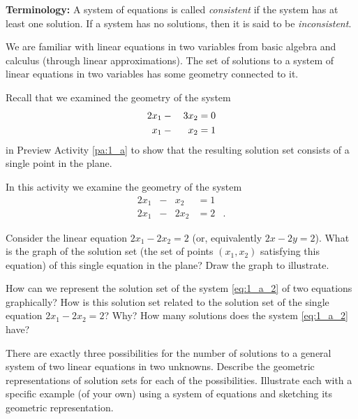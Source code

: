 \noindent \textbf{Terminology:} A system of equations is called \emph{consistent} if the system has at least one solution. If a system has no solutions, then it is said to be \emph{inconsistent}.


We are familiar with linear equations in two variables from basic algebra and calculus (through linear approximations). The set of solutions to a system of linear equations in two variables has some geometry connected to it.


\begin{activity} \label{act:1_a_2} Recall that we examined the geometry of the system 
\begin{alignat}{4}
2x_1 	&{}-{}	&3x_2 	&= 0  \notag \\%
x_1 	&{}-{} 	&x_2		&= 1 \notag %
\end{alignat}
in Preview Activity \ref{pa:1_a} to show that the resulting solution set consists of a single point in the plane.

In this activity we examine the geometry of the system 
\begin{equation}\label{eq:1_a_2}
\begin{alignedat}{4}
{2}x_1 	&{}-{}	&{}x_2 	&= 1&{}  \\ %
{2}x_1 	&{}-{} 	&{2}x_2		&= 2&{.} %
\end{alignedat}
\end{equation}
\ba
\item Consider the linear equation $2x_1-2x_2=2$ (or, equivalently $2x-2y=2$). What is the graph of the solution set (the set of points $(x_1, x_2)$ satisfying this equation) of this single equation in the plane? Draw the graph to illustrate. 


\item How can we represent the solution set of the system \eqref{eq:1_a_2} of two equations graphically? How is this solution set related to the solution set of the single equation $2x_1-2x_2=2$? Why? How many solutions does the system \eqref{eq:1_a_2} have? 


\item There are exactly three possibilities for the number of solutions to a general system of two linear equations in two unknowns. Describe the geometric representations of solution sets for each of the possibilities. Illustrate each with a specific example (of your own) using a system of equations and sketching its geometric representation. 

\ea

\end{activity}

